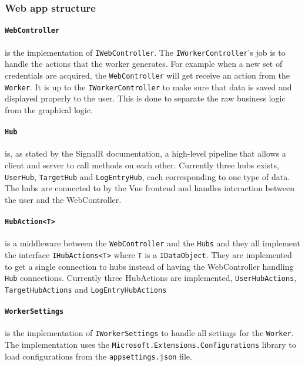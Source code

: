 \documentclass{article}
\begin{document}
\subsubsection{Web app structure}
\paragraph{\texttt{WebController}} is the implementation of \texttt{IWebController}. The \texttt{IWorkerController}'s job is to handle the actions that the worker generates. For example when a new set of credentials are acquired, the \texttt{WebController} will get receive an action from the \texttt{Worker}. It is up to the \texttt{IWorkerController} to make sure that data is saved and displayed properly to the user. This is done to separate the raw business logic from the graphical logic.

\paragraph{\texttt{Hub}} is, as stated by the SignalR documentation, a high-level pipeline that allows a client and server to call methods on each other\cite{url:implementation:signalr}. Currently three hubs exists, \texttt{UserHub}, \texttt{TargetHub} and \texttt{LogEntryHub}, each corresponding to one type of data. The hubs are connected to by the Vue frontend and handles interaction between the user and the WebController.

\paragraph{\texttt{HubAction<T>}} is a middleware between the \texttt{WebController} and the \texttt{Hubs} and they all implement the interface \texttt{IHubActions<T>} where \texttt{T} is a \texttt{IDataObject}. They are implemented to get a single connection to hubs instead of having the WebController handling \texttt{Hub} connections. Currently three HubActions are implemented, \texttt{UserHubActions}, \texttt{TargetHubActions} and \texttt{LogEntryHubActions}

\paragraph{\texttt{WorkerSettings}} is the implementation of \texttt{IWorkerSettings} to handle all settings for the \texttt{Worker}. The implementation uses the \texttt{Microsoft.Extensions.Configurations} library to load configurations from the \texttt{appsettings.json} file.
\end{document}

